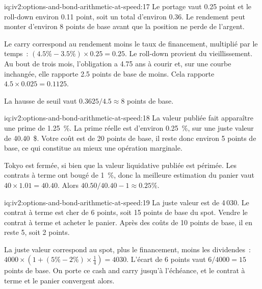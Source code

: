 \begin{solution}{iq:iv2:options-and-bond-arithmetic-at-speed:17}
Le portage vaut 0.25 point et le roll-down environ 0.11 point, soit un total d'environ 0.36. Le rendement peut monter d'environ 8 points de base avant que la position ne perde de l'argent.

Le carry correspond au rendement moins le taux de financement, multiplié par le temps~: $(4.5\% - 3.5\%) \times 0.25 = 0.25$. Le roll-down provient du vieillissement. Au bout de trois mois, l'obligation a 4.75 ans à courir et, sur une courbe inchangée, elle rapporte 2.5 points de base de moins. Cela rapporte $4.5 \times 0.025 = 0.1125$.

La hausse de seuil vaut $0.3625/4.5 \approx 8$ points de base.

\end{solution}

\begin{solution}{iq:iv2:options-and-bond-arithmetic-at-speed:18}
La valeur publiée fait apparaître une prime de 1.25~\%. La prime réelle est d'environ 0.25~\%, sur une juste valeur de 40.40~\$. Votre coût est de 20 points de base, il reste donc environ 5 points de base, ce qui constitue au mieux une opération marginale.

Tokyo est fermée, si bien que la valeur liquidative publiée est périmée. Les contrats à terme ont bougé de 1~\%, donc la meilleure estimation du panier vaut $40 \times 1.01 = 40.40$. Alors $40.50/40.40 - 1 \approx 0.25\%$.

\end{solution}

\begin{solution}{iq:iv2:options-and-bond-arithmetic-at-speed:19}
La juste valeur est de 4\,030. Le contrat à terme est cher de 6 points, soit 15 points de base du spot. Vendre le contrat à terme et acheter le panier. Après des coûts de 10 points de base, il en reste 5, soit 2 points.

La juste valeur correspond au spot, plus le financement, moins les dividendes~: $4000 \times (1 + (5\% - 2\%) \times \tfrac14) = 4030$. L'écart de 6 points vaut $6/4000 = 15$ points de base. On porte ce cash and carry jusqu'à l'échéance, et le contrat à terme et le panier convergent alors.

\end{solution}

